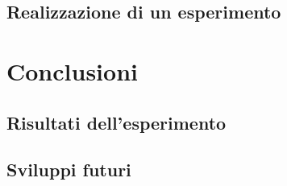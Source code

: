 \documentclass [10pt, a4paper, onecolumn, oneside] {scrreprt}
\numberwithin{endnote}{chapter}
\renewcommand{\lstlistlistingname}{Elenco dei codici}}
\begin{document}
	\section{Realizzazione di un esperimento} \label{sez:esperimento}
		 \vfill



\chapter{Conclusioni} \label{cap:conclusioni}
		 \vfill\eject
	\section{Risultati dell'esperimento} \label{sez:risultati}
		 \vfill
	\section{Sviluppi futuri} \label{sez:sviluppi}
		 \vfill







\eject
\newpage
\thispagestyle{empty}
\mbox{}

\appendix{}
%

\eject
\newpage
\thispagestyle{empty}
\mbox{}

\listoffigures
\begingroup
\let \clearpage \relax
{}
\vfill \listoftables
\vfill \lstlistoflistings
\endgroup
\eject
\newpage
\thispagestyle{empty}
\mbox{}

%


\vfill\eject


\end{document}
